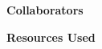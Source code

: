 \documentclass[12pt,letterpaper]{article}
\begin{document}
\textbf{Collaborators}

\textbf{Resources Used}

\noindent\makebox[\linewidth]{\rule{\linewidth}{0.4pt}}

\cite{../Goodfellow-et-al-2016}

\newpage


\end{document}
